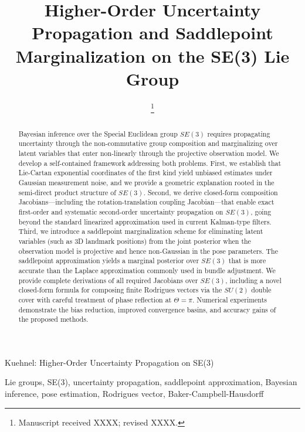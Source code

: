 \documentclass[journal]{IEEEtran}
\begin{document}
\title{Higher-Order Uncertainty Propagation and Saddlepoint Marginalization on the SE(3) Lie Group}

\author{
\thanks{Manuscript received XXXX; revised XXXX.}}

%
{Kuehnel: Higher-Order Uncertainty Propagation on SE(3)}

\maketitle

\begin{abstract}
Bayesian inference over the Special Euclidean group $SE(3)$ requires propagating 
uncertainty through the non-commutative group composition and marginalizing over 
latent variables that enter non-linearly through the projective observation model.
We develop a self-contained framework addressing both problems. 
First, we establish that Lie-Cartan exponential coordinates of the first kind 
yield unbiased estimates under Gaussian measurement noise, and we provide a 
geometric explanation rooted in the semi-direct product structure of $SE(3)$.
Second, we derive closed-form composition Jacobians---including the 
rotation-translation coupling Jacobian---that enable exact first-order 
and systematic second-order uncertainty propagation on $SE(3)$, 
going beyond the standard linearized approximation used in current 
Kalman-type filters.
Third, we introduce a saddlepoint marginalization scheme for eliminating 
latent variables (such as 3D landmark positions) from the joint posterior 
when the observation model is projective and hence non-Gaussian in the 
pose parameters. The saddlepoint approximation yields a 
marginal posterior over $SE(3)$ that is more accurate than the 
Laplace approximation commonly used in bundle adjustment.
We provide complete derivations of all required Jacobians over $SE(3)$,
including a novel closed-form formula for composing finite Rodrigues 
vectors via the $SU(2)$ double cover with careful treatment of 
phase reflection at $\Theta = \pi$. Numerical experiments 
demonstrate the bias reduction, improved convergence basins, 
and accuracy gains of the proposed methods.
\end{abstract}

\begin{IEEEkeywords}
Lie groups, SE(3), uncertainty propagation, saddlepoint approximation, 
Bayesian inference, pose estimation, Rodrigues vector, Baker-Campbell-Hausdorff
\end{IEEEkeywords}
\end{document}
